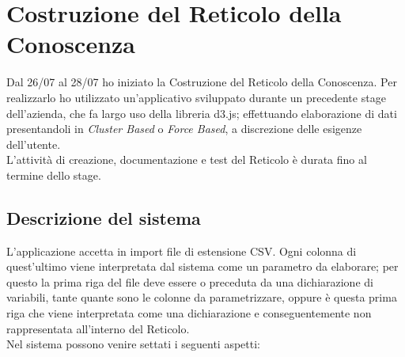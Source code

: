 \section{Costruzione del Reticolo della Conoscenza}
\label{Costruzione del Reticolo della Conoscenza}
Dal 26/07  al 28/07 ho iniziato la Costruzione del Reticolo della Conoscenza. Per realizzarlo ho utilizzato un'applicativo sviluppato durante un precedente stage dell'azienda, che fa largo uso della libreria d3.js; effettuando elaborazione di dati presentandoli in \textit{Cluster Based} o \textit{Force Based}, a discrezione delle esigenze dell'utente.\\
L'attivit\`a di creazione, documentazione e test del Reticolo \`e durata fino al termine dello stage.

\subsection{Descrizione del sistema}
\label{Descrizione del sistema}
L'applicazione accetta in import file di estensione CSV. Ogni colonna di quest'ultimo viene interpretata dal sistema come un parametro da elaborare; per questo la prima riga del file deve essere o preceduta da una dichiarazione di variabili, tante quante sono le colonne da parametrizzare, oppure \`e questa prima riga che viene interpretata come una dichiarazione e conseguentemente non rappresentata all'interno del Reticolo.\\
Nel sistema possono venire settati i seguenti aspetti:
